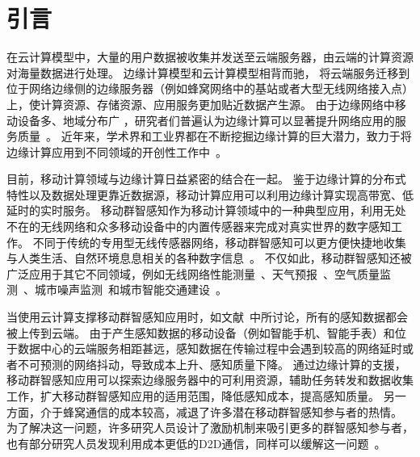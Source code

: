 \section{引言}



在云计算模型中，大量的用户数据被收集并发送至云端服务器，由云端的计算资源对海量数据进行处理。
边缘计算模型和云计算模型相背而驰，
将云端服务迁移到位于网络边缘侧的边缘服务器（例如蜂窝网络中的基站或者大型无线网络接入点）上，使计算资源、存储资源、应用服务更加贴近数据产生源。
由于边缘网络中移动设备多、地域分布广%
，研究者们普遍认为边缘计算可以显著提升网络应用的服务质量~\cite{DBLP:conf/sigcomm/BonomiMZA12}。
近年来，学术界和工业界都在不断挖掘边缘计算的巨大潜力，致力于将边缘计算应用到不同领域的开创性工作中~\cite{DBLP:journals/access/MarjanovicAZ18,DBLP:journals/iotj/ChiangZ16}。


目前，移动计算领域与边缘计算日益紧密的结合在一起。
鉴于边缘计算的分布式特性以及数据处理更靠近数据源，移动计算应用可以利用边缘计算实现高带宽、低延时的实时服务。
移动群智感知作为移动计算领域中的一种典型应用，利用无处不在的无线网络和众多移动设备中的内置传感器来完成对真实世界的数字感知工作。
不同于传统的专用型无线传感器网络，移动群智感知可以更方便快捷地收集与人类生活、自然环境息息相关的各种数字信息~\cite{DBLP:journals/cm/GuoCZYC16}。
不仅如此，移动群智感知还被广泛应用于其它不同领域，例如无线网络性能测量~\cite{DBLP:journals/cm/RosenLLCMB14}、天气预报~\cite{DBLP:journals/tpds/ZhaoMTL15}、空气质量监测~\cite{DBLP:conf/huc/ZhangXWC14}、城市噪声监测~\cite{DBLP:conf/huc/ZhengLWZLC14}和城市智能交通建设~\cite{DBLP:conf/icdcs/ZhouJL15}。

当使用云计算支撑移动群智感知应用时，如文献~\cite{DBLP:journals/fgcs/AntonicMPZ16,DBLP:conf/ccnc/MessaoudRG16}中所讨论，所有的感知数据都会被上传到云端。
由于产生感知数据的移动设备（例如智能手机、智能手表）和位于数据中心的云端服务相距甚远，感知数据在传输过程中会遇到较高的网络延时或者不可预测的网络抖动，导致成本上升、感知质量下降。
通过边缘计算的支援，移动群智感知应用可以探索边缘服务器中的可利用资源，辅助任务转发和数据收集工作，扩大移动群智感知应用的适用范围，降低感知成本，提高感知质量。
另一方面，介于蜂窝通信的成本较高，减退了许多潜在移动群智感知参与者的热情。
为了解决这一问题，许多研究人员设计了激励机制来吸引更多的群智感知参与者，也有部分研究人员发现利用成本更低的D2D通信，同样可以缓解这一问题~\cite{DBLP:journals/puc/WangLL17}。

